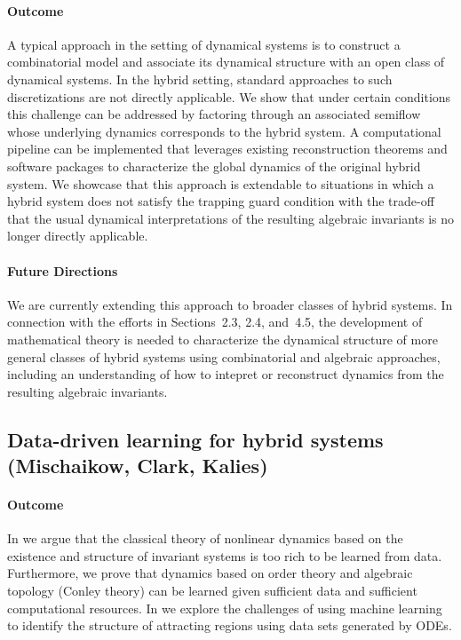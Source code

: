 \documentclass[letterpaper,11pt]{article}
\begin{document}
\paragraph*{Outcome} A typical approach in the setting of dynamical systems is to construct a combinatorial model and associate its dynamical structure with an open class of dynamical systems. In the hybrid setting, standard approaches to such discretizations are not directly applicable. We show that under certain conditions this challenge can be addressed by factoring through an associated semiflow whose underlying dynamics corresponds to the hybrid system. A computational pipeline can be implemented that leverages existing reconstruction theorems and software packages to characterize the global dynamics of the original hybrid system. We showcase that this approach is extendable to situations in which a hybrid system does not satisfy the trapping guard condition with the trade-off that the usual dynamical interpretations  of the resulting algebraic invariants is no longer directly applicable. 

\paragraph*{Future Directions} We are currently extending this approach to broader classes of hybrid systems. In connection with the efforts in Sections~2.3, 2.4, and~4.5, the development of mathematical theory is needed to characterize the dynamical structure of more general classes of hybrid systems using combinatorial and algebraic approaches, including
an understanding of how to intepret or reconstruct dynamics from the resulting algebraic invariants.

\subsection{Data-driven learning for hybrid systems (Mischaikow, Clark, Kalies)}
\paragraph*{Outcome}
In \cite{gameiro2025rigorouslycharacterizingdynamicsmachine} we argue that the classical theory of nonlinear dynamics based on the existence and structure of invariant systems is too rich to be learned from data.
Furthermore, we prove that dynamics based on order theory and algebraic topology (Conley theory) can be learned given sufficient data and sufficient computational resources.
In \cite{gameiro2025datadrivenidentificationattractorsusing} we explore the challenges of using machine learning to identify the structure of attracting regions using data sets generated by ODEs.
\end{document}
